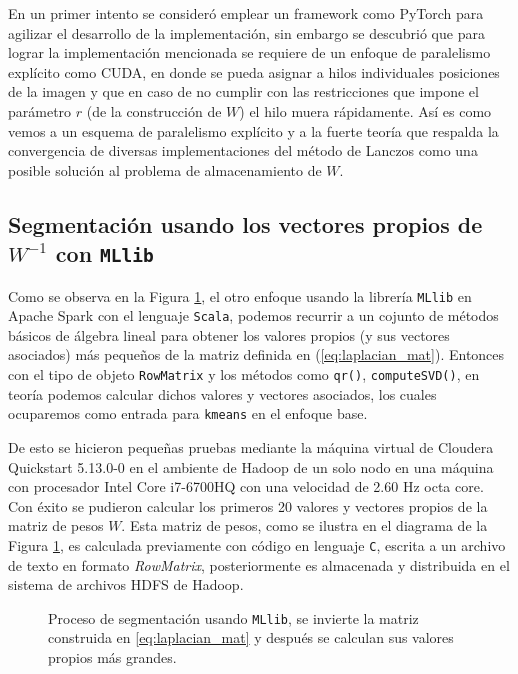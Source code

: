 \documentclass[conference]{IEEEtran}
\begin{document}
En un primer intento se consideró emplear un framework como PyTorch \cite{PyTorch} para agilizar el desarrollo de la implementación, sin embargo se descubrió que para lograr la implementación mencionada se requiere de un enfoque de paralelismo explícito como CUDA, en donde se pueda asignar a hilos individuales posiciones de la imagen y que en caso de no cumplir con las restricciones que impone el parámetro $r$ (de la construcción de $W$) el hilo muera rápidamente. Así es como vemos a un esquema de paralelismo explícito y a la fuerte teoría que respalda la convergencia de diversas implementaciones del método de Lanczos \cite{MatrixC} como una posible solución al problema de almacenamiento de $W$.


\subsection{Segmentación usando los vectores propios de $W^{-1}$ con \texttt{MLlib}}


Como se observa en la Figura \ref{flowchart_invert_laplacian}, el otro enfoque usando la librería \texttt{MLlib} en Apache Spark con el lenguaje \texttt{Scala}, podemos recurrir a un cojunto de métodos básicos de álgebra lineal para obtener los valores propios (y sus vectores asociados) más pequeños de la matriz definida en (\ref{eq:laplacian_mat}). Entonces con el tipo de objeto \texttt{RowMatrix} y los métodos como \texttt{qr()}, \texttt{computeSVD()}, en teoría podemos calcular dichos valores y vectores asociados, los cuales ocuparemos como entrada para \texttt{kmeans} en el enfoque base.

\medskip

De esto se hicieron pequeñas pruebas mediante la máquina virtual de Cloudera Quickstart 5.13.0-0 en el ambiente de Hadoop de un solo nodo en una máquina con procesador Intel Core i7-6700HQ con una velocidad de 2.60 Hz octa core. Con éxito se pudieron calcular los primeros 20 valores y vectores propios de la matriz de pesos $W$. Esta matriz de pesos, como se ilustra en el diagrama de la Figura \ref{flowchart_invert_laplacian}, es calculada previamente con código en lenguaje \texttt{C}, escrita a un archivo de texto en formato \textit{RowMatrix}, posteriormente es almacenada y distribuida en el sistema de archivos HDFS de Hadoop.

\begin{figure}[htbp]
\caption{Proceso de segmentación usando \texttt{MLlib}, se invierte la matriz construida en \ref{eq:laplacian_mat} y después se calculan sus valores propios más grandes.}
\label{flowchart_invert_laplacian}
\end{figure}
\end{document}
